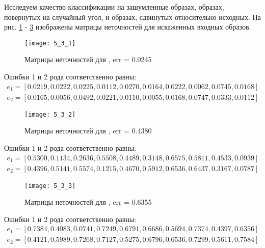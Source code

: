 
Исследуем качество классификации на зашумленные образах, образах, повернутых на случайный угол, и образах, сдвинутых относительно исходных. На рис. \ref{fig:5_3_1} - \ref{fig:5_3_3} изображены матрицы неточностей для искаженных входных образов.
\begin{figure}[H]
\begin{center}
	\texttt{[image: 5\_3\_1]}
	\caption{Матрицы неточностей для , err = 0.0245}
	\label{fig:5_3_1}
\end{center}
\end{figure}
Ошибки 1 и 2 рода соответственно равны:
\begin{gather*}
e_1 = [0.0219, 0.0222, 0.0225, 0.0112, 0.0270, 0.0164, 0.0222, 0.0062, 0.0745, 0.0168]\\
e_2 = [0.0165, 0.0056, 0.0492, 0.0221, 0.0110, 0.0055, 0.0168, 0.0747, 0.0333, 0.0112]
\end{gather*}

\begin{figure}[H]
\begin{center}
	\texttt{[image: 5\_3\_2]}
	\caption{Матрицы неточностей для , err = 0.4380}
	\label{fig:5_3_2}
\end{center}
\end{figure}
Ошибки 1 и 2 рода соответственно равны:
\begin{gather*}
e_1 = [0.5300, 0.1134, 0.2636, 0.5508, 0.4489, 0.3148, 0.6575, 0.5811, 0.4533, 0.0939]\\
e_2 = [0.4396, 0.5141, 0.5574, 0.1215, 0.4670, 0.5912, 0.6536, 0.6437, 0.3167, 0.0787]
\end{gather*}

\begin{figure}[H]
\begin{center}
	\texttt{[image: 5\_3\_3]}
	\caption{Матрицы неточностей для , err = 0.6355}
	\label{fig:5_3_3}
\end{center}
\end{figure}
Ошибки 1 и 2 рода соответственно равны:
\begin{gather*}
e_1 = [0.7384, 0.4083, 0.0741, 0.7249, 0.6791, 0.6686, 0.5694, 0.7374, 0.4397, 0.6356]\\
e_2 = [0.4121, 0.5989, 0.7268, 0.7127, 0.5275, 0.6796, 0.6536, 0.7299, 0.5611, 0.7584]
\end{gather*}

